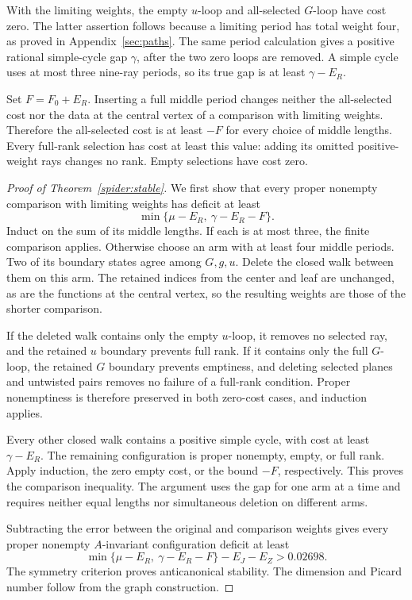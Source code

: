 With the limiting weights, the empty $u$-loop and all-selected $G$-loop
have cost zero. The latter assertion follows because a limiting period
has total weight four, as proved in Appendix~\ref{sec:paths}. The same
period calculation gives a positive rational simple-cycle gap $\gamma$,
after the two zero loops are removed. A simple cycle uses at most
three nine-ray periods, so its true gap is at least $\gamma-E_R$.

Set $F=F_0+E_R$. Inserting a full middle period changes neither the
all-selected cost nor the data at the central vertex of a comparison
with limiting weights. Therefore the all-selected cost is at least $-F$ for every choice of middle
lengths. Every full-rank selection has cost at least this value:
adding its omitted positive-weight rays changes no rank. Empty
selections have cost zero.

\begin{proof}[Proof of Theorem~\ref{spider:stable}]
We first show that every proper nonempty comparison with limiting weights
has deficit at least
\[
 \min\{\mu-E_R,\ \gamma-E_R-F\}.
\]
Induct on the sum of its middle lengths. If each is at most three,
the finite comparison applies. Otherwise choose an arm with at least
four middle periods. Two of its boundary states agree among $G,g,u$.
Delete the closed walk between them on this arm. The retained indices
from the center and leaf are unchanged, as are the functions at the central
vertex, so the resulting weights are those of the shorter comparison.

If the deleted walk contains only the empty $u$-loop, it removes no
selected ray, and the retained $u$ boundary prevents full rank. If it
contains only the full $G$-loop, the retained $G$ boundary prevents
emptiness, and deleting selected planes and untwisted pairs removes
no failure of a full-rank condition. Proper nonemptiness is therefore
preserved in both zero-cost cases, and induction applies.

Every other closed walk contains a positive simple cycle, with cost
at least $\gamma-E_R$. The remaining configuration is proper nonempty,
empty, or full rank. Apply induction, the zero empty cost, or the bound
$-F$, respectively. This proves the comparison inequality. The argument
uses the gap for one arm at a time and requires neither equal lengths nor
simultaneous deletion on different arms.

Subtracting the error between the original and comparison weights gives
every proper nonempty $A$-invariant configuration deficit at least
\[
 \min\{\mu-E_R,\ \gamma-E_R-F\}-E_J-E_Z>0.02698.
\]
The symmetry criterion proves anticanonical stability. The dimension
and Picard number follow from the graph construction.
\end{proof}
